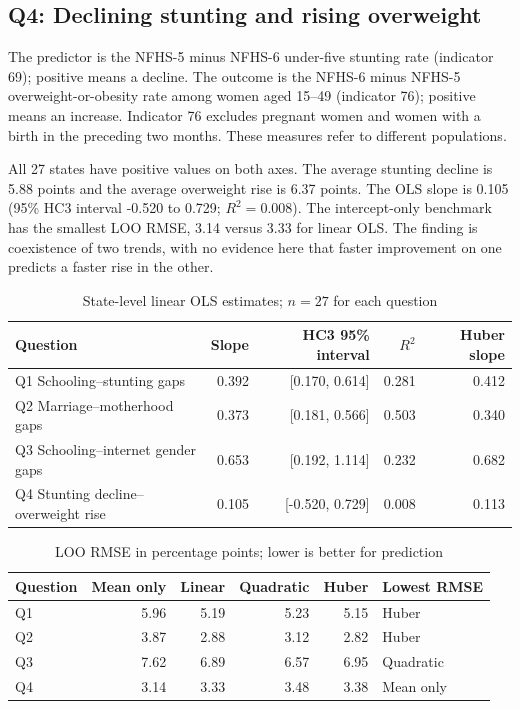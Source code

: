 \documentclass[11pt,a4paper]{article}
\begin{document}
\subsection{Q4: Declining stunting and rising overweight}
The predictor is the NFHS-5 minus NFHS-6 under-five stunting rate
(indicator 69); positive means a decline. The outcome is the NFHS-6
minus NFHS-5 overweight-or-obesity rate among women aged 15--49
(indicator 76); positive means an increase. Indicator 76 excludes
pregnant women and women with a birth in the preceding two months.
These measures refer to different populations.

All 27 states have positive values on both axes. The average stunting
decline is 5.88 points and the average overweight rise is 6.37 points.
The OLS slope is 0.105 (95\% HC3 interval -0.520 to 0.729;
$R^2=0.008$). The intercept-only benchmark has the smallest LOO
RMSE, 3.14 versus 3.33 for linear OLS. The finding is coexistence
of two trends, with no evidence here that faster improvement on one
predicts a faster rise in the other.

\begin{table}[H]
\centering
\caption{State-level linear OLS estimates; $n=27$ for each question}
\label{tab:estimates}
\begin{tabular}{lrrrr}
\toprule
Question & Slope & HC3 95\% interval & $R^2$ & Huber slope \\
\midrule
Q1 Schooling--stunting gaps & 0.392 & [0.170, 0.614] & 0.281 & 0.412 \\
Q2 Marriage--motherhood gaps & 0.373 & [0.181, 0.566] & 0.503 & 0.340 \\
Q3 Schooling--internet gender gaps & 0.653 & [0.192, 1.114] & 0.232 & 0.682 \\
Q4 Stunting decline--overweight rise & 0.105 & [-0.520, 0.729] & 0.008 & 0.113 \\
\bottomrule
\end{tabular}
\end{table}

\begin{table}[H]
\centering
\caption{LOO RMSE in percentage points; lower is better for prediction}
\label{tab:prediction}
\begin{tabular}{lrrrrl}
\toprule
Question & Mean only & Linear & Quadratic & Huber & Lowest RMSE \\
\midrule
Q1 & 5.96 & 5.19 & 5.23 & 5.15 & Huber \\
Q2 & 3.87 & 2.88 & 3.12 & 2.82 & Huber \\
Q3 & 7.62 & 6.89 & 6.57 & 6.95 & Quadratic \\
Q4 & 3.14 & 3.33 & 3.48 & 3.38 & Mean only \\
\bottomrule
\end{tabular}
\end{table}
\end{document}

